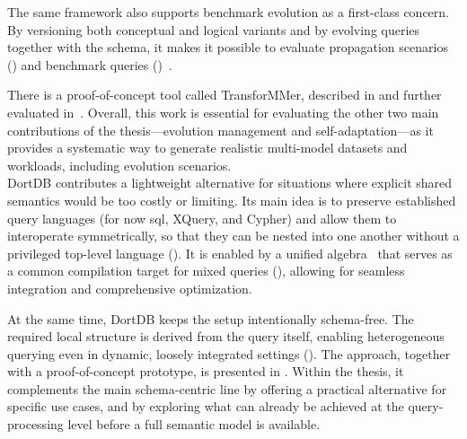 The same framework also supports benchmark evolution as a first-class concern. By versioning both conceptual and logical variants and by evolving queries together with the schema, it makes it possible to evaluate propagation scenarios () and benchmark queries ()~\citep{is_2026}.

There is a proof-of-concept tool called TransforMMer, described in  and further evaluated in~\citep{is_2026}. Overall, this work is essential for evaluating the other two main contributions of the thesis---evolution management and self-adaptation---as it provides a systematic way to generate realistic multi-model datasets and workloads, including evolution scenarios.\\

DortDB contributes a lightweight alternative for situations where explicit shared semantics would be too costly or limiting. Its main idea is to preserve established query languages (for now \acrshort{sql}, XQuery, and Cypher) and allow them to interoperate symmetrically, so that they can be nested into one another without a privileged top-level language (). It is enabled by a unified algebra~\citep{jezek_2026} that serves as a common compilation target for mixed queries (), allowing for seamless integration and comprehensive optimization.

At the same time, DortDB keeps the setup intentionally schema-free. The required local structure is derived from the query itself, enabling heterogeneous querying even in dynamic, loosely integrated settings (). The approach, together with a proof-of-concept prototype, is presented in . Within the thesis, it complements the main schema-centric line by offering a practical alternative for specific use cases, and by exploring what can already be achieved at the query-processing level before a full semantic model is available.
